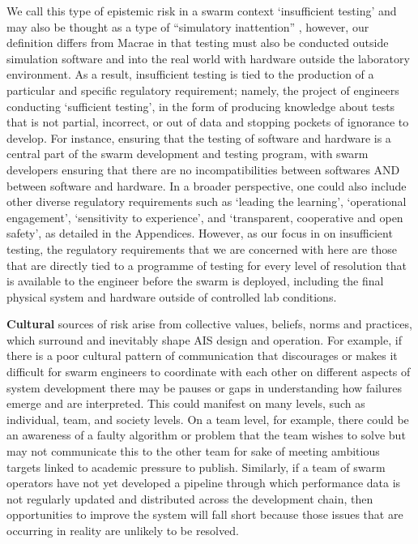 \documentclass[lettersize,journal]{IEEEtran}
\begin{document}
We call this type of epistemic risk in a swarm context `insufficient testing’ and may also be thought as a type of ``simulatory inattention” \cite{macrae2021learning}, however, our definition differs from Macrae in that testing must also be conducted outside simulation software and into the real world with hardware outside the laboratory environment. As a result, insufficient testing is tied to the production of a particular and specific regulatory requirement; namely, the project of engineers conducting `sufficient testing', in the form of producing knowledge about tests that is not partial, incorrect, or out of data and stopping pockets of ignorance to develop. For instance, ensuring that the testing of software and hardware is a central part of the swarm development and testing program, with swarm developers ensuring that there are no incompatibilities between softwares AND between software and hardware. In a broader perspective, one could also include other diverse regulatory requirements such as `leading the learning', `operational engagement’, `sensitivity to experience’, and `transparent, cooperative and open safety’, as detailed in the Appendices. However, as our focus in on insufficient testing, the regulatory requirements that we are concerned with here are those that are directly tied to a programme of testing for every level of resolution that is available to the engineer before the swarm is deployed, including the final physical system and hardware outside of controlled lab conditions. 

\textbf{Cultural} sources of risk arise from collective values, beliefs, norms and practices, which surround and inevitably shape AIS design and operation. For example, if there is a poor cultural pattern of communication that discourages or makes it difficult for swarm engineers to coordinate with each other on different aspects of system development there may be pauses or gaps in understanding how failures emerge and are interpreted. This could manifest on many levels, such as individual, team, and society levels. On a team level, for example, there could be an awareness of a faulty algorithm or problem that the team wishes to solve but may not communicate this to the other team for sake of meeting ambitious targets linked to academic pressure to publish. Similarly, if a team of swarm operators have not yet developed a pipeline through which performance data is not regularly updated and distributed across the development chain, then opportunities to improve the system will fall short because those issues that are occurring in reality are unlikely to be resolved. 
\end{document}
